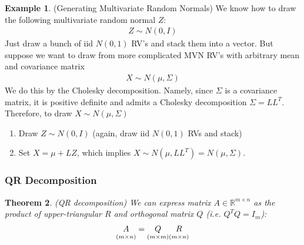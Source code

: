 \documentclass[12pt]{article}
\numberwithin{equation}{section} %
\theoremstyle{plain}
\newtheorem{thm}{Theorem}[section]
\theoremstyle{definition}
\newtheorem{ex}[thm]{Example}
\theoremstyle{remark}
\newcommand{\Rmn}{\mathbb{R}^{m\times n}}
\begin{document}
\begin{ex}(Generating Multivariate Random Normals)
We know how to draw the following multivariate random normal $Z$:
\begin{align*}
  Z \sim N(0,I)
\end{align*}
Just draw a bunch of iid $N(0,1)$ RV's and stack them into a vector.
But suppose we want to draw from more complicated MVN RV's with
arbitrary mean and covariance matrix
\begin{align*}
  X \sim N(\mu, \Sigma)
\end{align*}
We do this by the Cholesky decomposition. Namely, since $\Sigma$ is a
covariance matrix, it is positive definite and admits a Cholesky
decomposition $\Sigma=LL^T$. Therefore, to draw $X\sim N(\mu,\Sigma)$
\begin{enumerate}
  \item Draw $Z\sim N(0,I)$ (again, draw iid $N(0,1)$ RVs and stack)
  \item Set $X=\mu+LZ$, which implies $X\sim N(\mu,LL^T)=N(\mu,\Sigma)$.
\end{enumerate}
\end{ex}


\clearpage
\subsubsection{QR Decomposition}


\begin{thm}\emph{(QR decomposition)}
We can express matrix $A\in\Rmn$ as the product of upper-triangular $R$
and orthogonal matrix $Q$ (i.e. $Q^TQ=I_m$):
\begin{align*}
  \underset{(m\times n)}{A\vphantom{Q}}
  =
  \underset{(m\times m)}{Q}
  \underset{(m\times n)}{R\vphantom{Q}}
\end{align*}
\end{thm}
\end{document}
